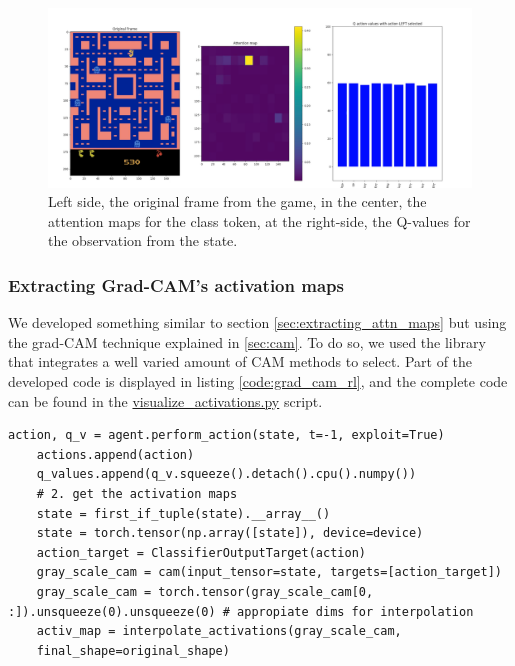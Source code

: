 \begin{figure} [!h]
	\centering
	\includegraphics[width=\linewidth]{figures/attn_visualization_frame}
	\caption{Left side, the original frame from the game, in the center, the attention maps for the class token, at the right-side, the Q-values for the observation from the state.}
	\label{fig:attnvisualizationframe}
\end{figure}



\subsubsection{Extracting Grad-CAM's activation maps}
\label{sec:grad_cam_act_maps}
We developed something similar to section \ref{sec:extracting_attn_maps} but using the grad-CAM technique explained in \ref{sec:cam}. To do so, we used the  library \cite{jacobgilpytorchcam} that integrates a well varied amount of CAM methods to select. Part of the developed code is displayed in listing \ref{code:grad_cam_rl}, and the complete code can be found in the \href{https://github.com/Javimh18/DL_TFM/blob/main/src/visualize_activations.py}{visualize\_activations.py} script.

\begin{lstlisting}[caption={Activation maps using Grad-CAM}, label={code:grad_cam_rl}]
	action, q_v = agent.perform_action(state, t=-1, exploit=True)
	actions.append(action)
	q_values.append(q_v.squeeze().detach().cpu().numpy())
	# 2. get the activation maps
	state = first_if_tuple(state).__array__()
	state = torch.tensor(np.array([state]), device=device)
	action_target = ClassifierOutputTarget(action)
	gray_scale_cam = cam(input_tensor=state, targets=[action_target])
	gray_scale_cam = torch.tensor(gray_scale_cam[0, :]).unsqueeze(0).unsqueeze(0) # appropiate dims for interpolation
	activ_map = interpolate_activations(gray_scale_cam,
	final_shape=original_shape)
\end{lstlisting}

